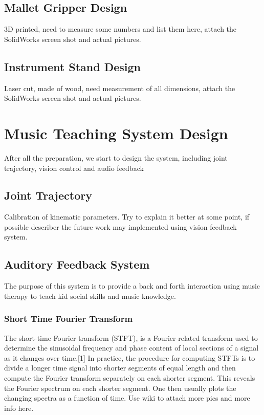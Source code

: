 \subsection{Mallet Gripper Design}
3D printed, need to measure some numbers and list them here, attach the SolidWorks
screen shot and actual pictures.

\subsection{Instrument Stand Design}
Laser cut, made of wood, need measurement of all dimensions, attach the SolidWorks
screen shot and actual pictures.

\section{Music Teaching System Design}
After all the preparation, we start to design the system, including joint trajectory, vision control and audio feedback

\subsection{Joint Trajectory}
Calibration of kinematic parameters. Try to explain it better at some point, if possible describer the future work may implemented using vision feedback system. 

\subsection{Auditory Feedback System}
The purpose of this system is to provide a back and forth interaction using music therapy to teach kid social skills and music knowledge.

\subsubsection{Short Time Fourier Transform}
The short-time Fourier transform (STFT), is a Fourier-related transform used to determine the sinusoidal frequency and phase content of local sections of a signal as it changes over time.[1] In practice, the procedure for computing STFTs is to divide a longer time signal into shorter segments of equal length and then compute the Fourier transform separately on each shorter segment. This reveals the Fourier spectrum on each shorter segment. One then usually plots the changing spectra as a function of time.
Use wiki to attach more pics and more info here.

